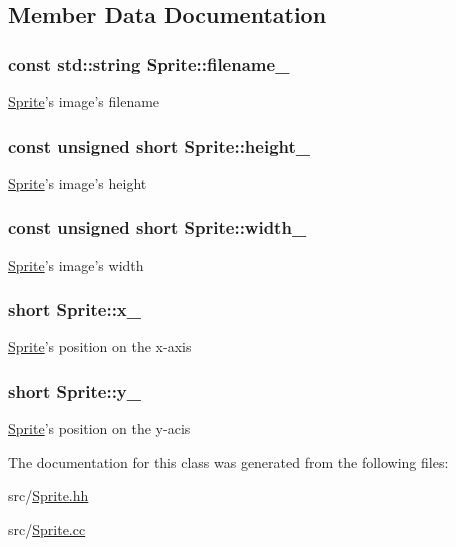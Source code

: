 \subsection{Member Data Documentation}
\hypertarget{classSprite_aaa19414e23ba5ea1b20bd8a04281a9f0}{
\subsubsection[{filename\-\_\-}]{\setlength{\rightskip}{0pt plus 5cm}const std\-::string Sprite\-::filename\-\_\-\hspace{0.3cm}{\ttfamily [private]}}}\label{classSprite_aaa19414e23ba5ea1b20bd8a04281a9f0}
\hyperlink{classSprite}{Sprite}'s image's filename \hypertarget{classSprite_ae2ddd489c30852d32b7a88d20af9df1e}{
\subsubsection[{height\-\_\-}]{\setlength{\rightskip}{0pt plus 5cm}const unsigned short Sprite\-::height\-\_\-\hspace{0.3cm}{\ttfamily [protected]}}}\label{classSprite_ae2ddd489c30852d32b7a88d20af9df1e}
\hyperlink{classSprite}{Sprite}'s image's height \hypertarget{classSprite_ac0c8b57b52d82f2753c1726e51ed0490}{
\subsubsection[{width\-\_\-}]{\setlength{\rightskip}{0pt plus 5cm}const unsigned short Sprite\-::width\-\_\-\hspace{0.3cm}{\ttfamily [protected]}}}\label{classSprite_ac0c8b57b52d82f2753c1726e51ed0490}
\hyperlink{classSprite}{Sprite}'s image's width \hypertarget{classSprite_ac66af2df2e5990c07252b8aa0d384346}{
\subsubsection[{x\-\_\-}]{\setlength{\rightskip}{0pt plus 5cm}short Sprite\-::x\-\_\-\hspace{0.3cm}{\ttfamily [protected]}}}\label{classSprite_ac66af2df2e5990c07252b8aa0d384346}
\hyperlink{classSprite}{Sprite}'s position on the x-\/axis \hypertarget{classSprite_a3ad6d07d083c5bbb2e819caa31d2bc6f}{
\subsubsection[{y\-\_\-}]{\setlength{\rightskip}{0pt plus 5cm}short Sprite\-::y\-\_\-\hspace{0.3cm}{\ttfamily [protected]}}}\label{classSprite_a3ad6d07d083c5bbb2e819caa31d2bc6f}
\hyperlink{classSprite}{Sprite}'s position on the y-\/acis 

The documentation for this class was generated from the following files\-:\begin{DoxyCompactItemize}
\item 
src/\hyperlink{Sprite_8hh}{Sprite.\-hh}\item 
src/\hyperlink{Sprite_8cc}{Sprite.\-cc}\end{DoxyCompactItemize}
